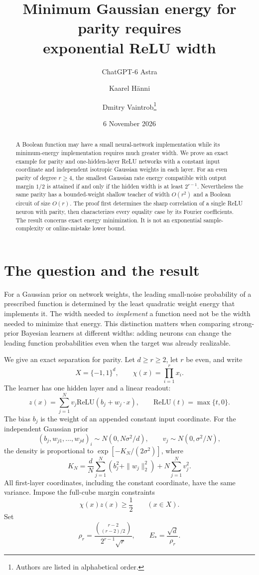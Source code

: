 \documentclass[11pt]{article}
\title{Minimum Gaussian energy for parity requires\protect\\exponential ReLU width}
\author{ChatGPT-6 Astra \and Kaarel H\"anni \and Dmitry Vaintrob\thanks{Authors are listed in alphabetical order.}}
\date{6 November 2026}
\newcommand{\relu}{\mathrm{ReLU}}
\begin{document}
\maketitle
\begin{abstract}
A Boolean function may have a small neural-network implementation while
its minimum-energy implementation requires much greater width.
We prove an exact example for parity and one-hidden-layer ReLU networks
with a constant input coordinate and independent isotropic Gaussian
weights in each layer. For an even parity of degree $r\ge4$, the smallest
Gaussian rate energy compatible with output margin $1/2$ is attained
if and only if the hidden width is at least $2^{r-1}$. Nevertheless the
same parity has a bounded-weight shallow teacher of width $O(r^2)$ and
a Boolean circuit of size $O(r)$.
The proof first determines the sharp correlation of a single ReLU neuron
with parity, then characterizes every equality case by its Fourier
coefficients. The result concerns exact energy minimization. It is not
an exponential sample-complexity or online-mistake lower bound.
\end{abstract}

\section{The question and the result}

For a Gaussian prior on network weights, the leading small-noise
probability of a prescribed function is determined by the least
quadratic weight energy that implements it. The width needed to
\emph{implement} a function need not be the width needed to minimize
that energy. This distinction matters when comparing strong-prior
Bayesian learners at different widths: adding neurons can change the
leading function probabilities even when the target was already
realizable.

We give an exact separation for parity. Let $d\ge r\ge2$, let $r$ be even,
and write
\[
 X=\{-1,1\}^d,\qquad \chi(x)=\prod_{i=1}^r x_i.
\]
The learner has one hidden layer and a linear readout:
\begin{equation}\label{eq:model}
 z(x)=\sum_{j=1}^N v_j\relu(b_j+w_j\cdot x),
 \qquad \relu(t)=\max\{t,0\}.
\end{equation}
The bias $b_j$ is the weight of an appended constant input coordinate.
For the independent Gaussian prior
\[
 (b_j,w_{j1},\ldots,w_{jd})_i\sim N(0,N\sigma^2/d),
 \qquad v_j\sim N(0,\sigma^2/N),
\]
the density is proportional to $\exp[-K_N/(2\sigma^2)]$, where
\begin{equation}\label{eq:energy}
 K_N=\frac dN\sum_{j=1}^N(b_j^2+\|w_j\|_2^2)
       +N\sum_{j=1}^Nv_j^2.
\end{equation}
All first-layer coordinates, including the constant coordinate, have
the same variance. Impose the full-cube margin constraints
\begin{equation}\label{eq:margin}
 \chi(x)z(x)\ge\frac12\qquad(x\in X).
\end{equation}
Set
\begin{equation}\label{eq:rho}
 \rho_r=\frac{\binom{r-2}{(r-2)/2}}{2^{r-1}\sqrt r},
 \qquad E_* =\frac{\sqrt d}{\rho_r}.
\end{equation}
\end{document}
